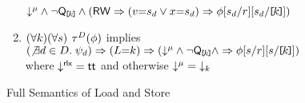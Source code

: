 \begin{figure*}
\begin{center}
\begin{minipage}{0.88\textwidth}
\begin{enumerate}
\begin{math}
{        \Dmode{\amode}
        \land \lnot\QxREF{\dVal}
        \land
        (\RW
         \limplies (\aVal{=}\bReg_\bEv\lor\aLoc{=}\bReg_\bEv) 
         \limplies \aForm[\bReg_\bEv/\aReg][\bReg_\bEv/\REF{\dVal}]
        )
      }      
    \end{math}
  \item %
    \begin{math}
      (\forall\dVal)
      (\forall\bReg)
    \end{math}
    $\aTr[\bEvs](\aForm)$ implies 
    \begin{math}
      (\not\exists\bEv\in\bEvs.\; \bForm_\bEv)
      \limplies (\cExp{=}\dVal)
      \limplies \PBR{        
        \Dmode{\amode}
        \land \lnot\QxREF{\dVal}
        \land
        \limplies \aForm[\bReg/\aReg][\bReg/\REF{\dVal}]
      }      
    \end{math}
    \\ where $\Dmode{\mRLX}=\TRUE$ and otherwise $\Dmode{\amode}=\Dx{\dVal}$
  \end{enumerate}  
  \end{minipage}
  \end{center}
  \caption{Full Semantics of Load and Store}
  \label{fig:full}
\end{figure*}